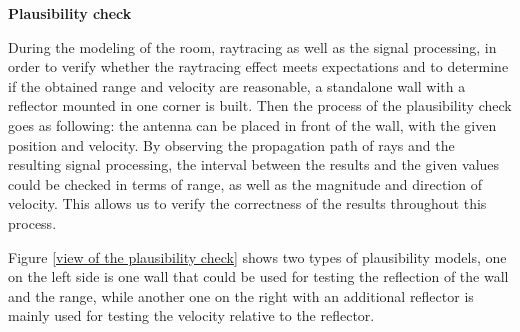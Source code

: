\documentclass[12pt,DIV14,BCOR12mm,a4paper,footinclude=false,headinclude,parskip=half-,twoside,openright,cleardoublepage=empty,toc=index,bibliography=totoc,listof=totoc]{scrreprt}
\numberwithin{equation}{chapter}
\begin{document}
\begin{spacing}{1.5}
\textbf{\large{Plausibility check}}
\end{spacing}

During the modeling of the room, raytracing as well as the signal processing, in order to verify whether the raytracing effect meets expectations and to determine if the obtained range and velocity are reasonable, a standalone wall with a reflector mounted in one corner is built. Then the process of the plausibility check goes as following: the antenna can be placed in front of the wall, with the given position and velocity. By observing the propagation path of rays and the resulting signal processing, the interval between the results and the given values could be checked in terms of range, as well as the magnitude and direction of velocity. This allows us to verify the correctness of the results throughout this process.

Figure \ref{view of the plausibility check} shows two types of plausibility models, one on the left side is one wall that could be used for testing the reflection of the wall and the range, while another one on the right with an additional reflector is mainly used for testing the velocity relative to the reflector. 
\end{document}
